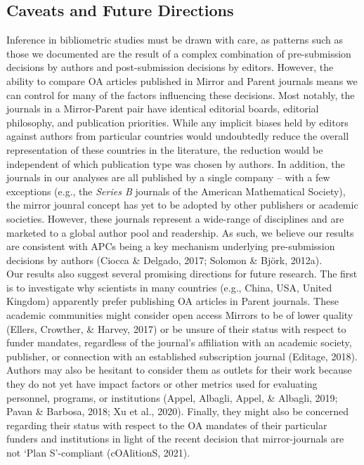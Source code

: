 \documentclass[
  english,
  man]{apa6}
\begin{document}
\hypertarget{caveats-and-future-directions}{%
\subsection{Caveats and Future Directions}\label{caveats-and-future-directions}}

Inference in bibliometric studies must be drawn with care, as patterns such as those we documented are the result of a complex combination of pre-submission decisions by authors and post-submission decisions by editors. However, the ability to compare OA articles published in Mirror and Parent journals means we can control for many of the factors influencing these decisions. Most notably, the journals in a Mirror-Parent pair have identical editorial boards, editorial philosophy, and publication priorities. While any implicit biases held by editors against authors from particular countries would undoubtedly reduce the overall representation of these countries in the literature, the reduction would be independent of which publication type was chosen by authors. In addition, the journals in our analyses are all published by a single company -- with a few exceptions (e.g., the \emph{Series B} journals of the American Mathematical Society), the mirror jounral concept has yet to be adopted by other publishers or academic societies. However, these journals represent a wide-range of disciplines and are marketed to a global author pool and readership. As such, we believe our results are consistent with APCs being a key mechanism underlying pre-submission decisions by authors (Ciocca \& Delgado, 2017; Solomon \& Björk, 2012a).\\
Our results also suggest several promising directions for future research. The first is to investigate why scientists in many countries (e.g., China, USA, United Kingdom) apparently prefer publishing OA articles in Parent journals. These academic communities might consider open access Mirrors to be of lower quality (Ellers, Crowther, \& Harvey, 2017) or be unsure of their status with respect to funder mandates, regardless of the journal's affiliation with an academic society, publisher, or connection with an established subscription journal (Editage, 2018). Authors may also be hesitant to consider them as outlets for their work because they do not yet have impact factors or other metrics used for evaluating personnel, programs, or institutions (Appel, Albagli, Appel, \& Albagli, 2019; Pavan \& Barbosa, 2018; Xu et al., 2020). Finally, they might also be concerned regarding their status with respect to the OA mandates of their particular funders and institutions in light of the recent decision that mirror-journals are not `Plan S'-compliant (cOAlitionS, 2021).\\
\end{document}
